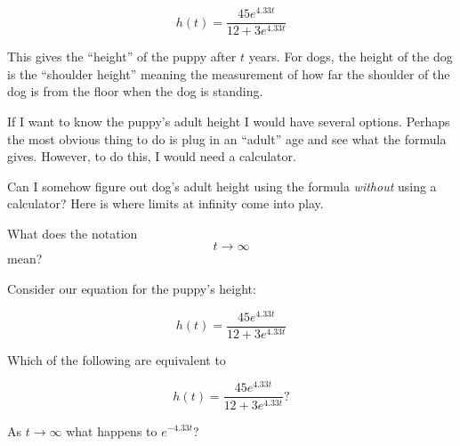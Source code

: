 \documentclass{ximera}
\begin{document}
\[
h(t) = \frac{45 e^{4.33 t}}{12+3 e^{4.33 t}}
\]

This gives the ``height'' of the puppy after $t$ years. For dogs, the
height of the dog is the ``shoulder height'' meaning the measurement
of how far the shoulder of the dog is from the floor when the dog is
standing.

If I want to know the puppy's adult height I would have several
options. Perhaps the most obvious thing to do is plug in an ``adult''
age and see what the formula gives. However, to do this, I would need
a calculator.

Can I somehow figure out dog's adult height using the formula
\emph{without} using a calculator? Here is where limits at infinity
come into play.


\begin{problem}
What does the notation
\[
t\to \infty
\]
mean?
\begin{multipleChoice}
\end{multipleChoice}
\end{problem}

Consider our equation for the puppy's height:


\[
h(t) = \frac{45 e^{4.33 t}}{12+3 e^{4.33 t}}
\]

\begin{problem}
Which of the following are equivalent to 

\[
h(t) = \frac{45 e^{4.33 t}}{12+3 e^{4.33 t}}?
\]

\begin{multipleChoice}
\end{multipleChoice}
\end{problem}

\begin{problem}
As $t\to \infty$ what happens to $e^{-4.33t}$?
\begin{multipleChoice}
\end{multipleChoice}
\end{problem}
\end{document}
